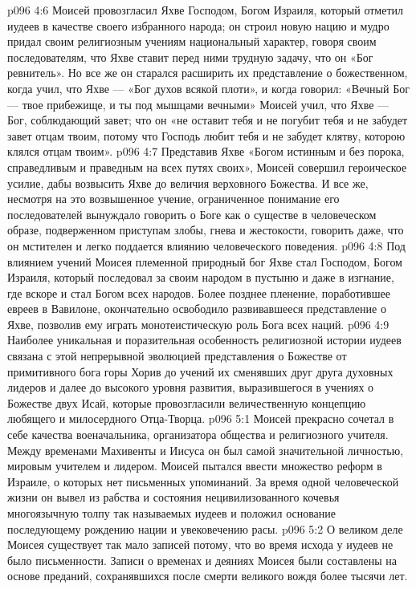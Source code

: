 \vs p096 4:6 Моисей провозгласил Яхве Господом, Богом Израиля, который отметил иудеев в качестве своего избранного народа; он строил новую нацию и мудро придал своим религиозным учениям национальный характер, говоря своим последователям, что Яхве ставит перед ними трудную задачу, что он «Бог ревнитель». Но все же он старался расширить их представление о божественном, когда учил, что Яхве --- «Бог духов всякой плоти», и когда говорил: «Вечный Бог --- твое прибежище, и ты под мышцами вечными» Моисей учил, что Яхве --- Бог, соблюдающий завет; что он «не оставит тебя и не погубит тебя и не забудет завет отцам твоим, потому что Господь любит тебя и не забудет клятву, которою клялся отцам твоим».
\vs p096 4:7 Представив Яхве «Богом истинным и без порока, справедливым и праведным на всех путях своих», Моисей совершил героическое усилие, дабы возвысить Яхве до величия верховного Божества. И все же, несмотря на это возвышенное учение, ограниченное понимание его последователей вынуждало говорить о Боге как о существе в человеческом образе, подверженном приступам злобы, гнева и жестокости, говорить даже, что он мстителен и легко поддается влиянию человеческого поведения.
\vs p096 4:8 Под влиянием учений Моисея племенной природный бог Яхве стал Господом, Богом Израиля, который последовал за своим народом в пустыню и даже в изгнание, где вскоре и стал Богом всех народов. Более позднее пленение, поработившее евреев в Вавилоне, окончательно освободило развивавшееся представление о Яхве, позволив ему играть монотеистическую роль Бога всех наций.
\vs p096 4:9 Наиболее уникальная и поразительная особенность религиозной истории иудеев связана с этой непрерывной эволюцией представления о Божестве от примитивного бога горы Хорив до учений их сменявших друг друга духовных лидеров и далее до высокого уровня развития, выразившегося в учениях о Божестве двух Исай, которые провозгласили величественную концепцию любящего и милосердного Отца\hyp{}Творца.
\vs p096 5:1 Моисей прекрасно сочетал в себе качества военачальника, организатора общества и религиозного учителя. Между временами Махивенты и Иисуса он был самой значительной личностью, мировым учителем и лидером. Моисей пытался ввести множество реформ в Израиле, о которых нет письменных упоминаний. За время одной человеческой жизни он вывел из рабства и состояния нецивилизованного кочевья многоязычную толпу так называемых иудеев и положил основание последующему рождению нации и увековечению расы.
\vs p096 5:2 О великом деле Моисея существует так мало записей потому, что во время исхода у иудеев не было письменности. Записи о временах и деяниях Моисея были составлены на основе преданий, сохранявшихся после смерти великого вождя более тысячи лет.
